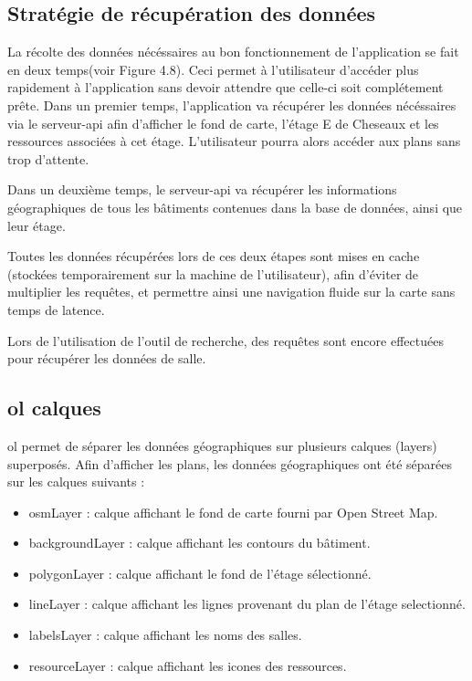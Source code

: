 \documentclass[
    iai, %
    il, %
]{heig-tb}
\begin{document}
\subsection{Stratégie de récupération des données}


La récolte des données nécéssaires au bon fonctionnement de l'application se fait en deux temps(voir Figure 4.8).
Ceci permet à l'utilisateur d'accéder plus rapidement à l'application sans devoir attendre que celle-ci soit complétement prête.
Dans un premier temps, l'application va récupérer les données nécéssaires via le serveur-api
afin d'afficher le fond de carte, l'étage E de Cheseaux et les ressources associées à cet étage.
L'utilisateur pourra alors accéder aux plans sans trop d'attente.

Dans un deuxième temps, le serveur-api va récupérer les informations géographiques de tous les bâtiments contenues dans la base de données,
ainsi que leur étage.

Toutes les données récupérées lors de ces deux étapes sont mises en cache (stockées temporairement sur la machine de l'utilisateur),
afin d'éviter de multiplier les requêtes, et permettre ainsi une navigation fluide sur la carte sans temps de latence.

Lors de l'utilisation de l'outil de recherche, des requêtes sont encore effectuées pour récupérer les données de salle.

\subsection{\gls{ol} calques}
\gls{ol} permet de séparer les données géographiques sur plusieurs calques (layers) superposés.
Afin d'afficher les plans, les données géographiques ont été séparées sur les calques suivants :

\begin{itemize}
    \item osmLayer : calque affichant le fond de carte fourni par Open Street Map.
    \item backgroundLayer : calque affichant les contours du bâtiment.
    \item polygonLayer : calque affichant le fond de l'étage sélectionné.
    \item lineLayer : calque affichant les lignes provenant du plan de l'étage selectionné.
    \item labelsLayer : calque affichant les noms des salles.
    \item resourceLayer : calque affichant les icones des ressources.
\end{itemize}
\end{document}
